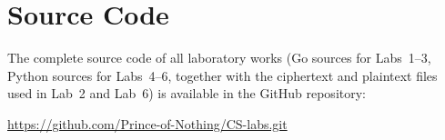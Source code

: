 \documentclass[12pt,a4paper]{article}
\begin{document}
\section*{Source Code}

The complete source code of all laboratory works (Go sources for Labs~1--3, Python sources for Labs~4--6, together with the ciphertext and plaintext files used in Lab~2 and Lab~6) is available in the GitHub repository:

\begin{center}
  \url{https://github.com/Prince-of-Nothing/CS-labs.git}
\end{center}
\end{document}

